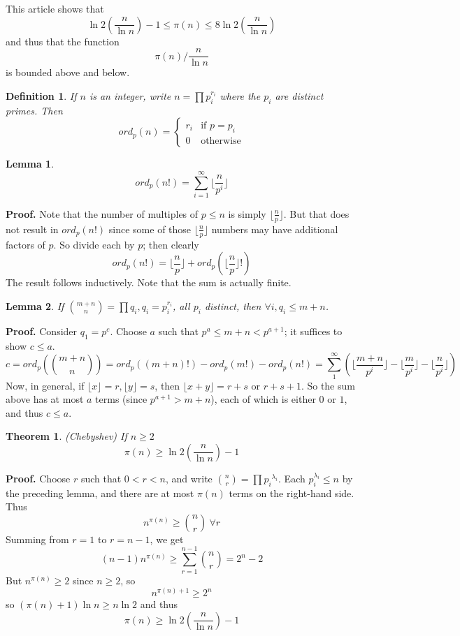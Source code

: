 \documentclass[12pt]{article}
\newtheorem{thm}{Theorem}
\newtheorem{defn}{Definition}
\newtheorem{lem}{Lemma}
\begin{document}
This article shows that
\[\ln 2\left(\frac{n}{\ln n}\right)-1\leq \pi(n)\leq 8\ln 2\left(\frac{n}{\ln n}\right)\]
and thus that the function
\[\pi(n)/\frac{n}{\ln n}\]
is bounded above and below.

\begin{defn} If $n$ is an integer, write $n=\prod p_i^{r_i}$ where the $p_i$ are distinct primes. Then
\[ord_p(n)=\begin{cases}
r_i&\text{if } p=p_i\\
0&\text{otherwise}
\end{cases}
\]
\end{defn}

\begin{lem}  
\[ord_p(n!)=\sum_{i=1}^{\infty}\lfloor \frac{n}{p^i}\rfloor\]
\end{lem}
\textbf{Proof.}
Note that the number of multiples of $p\leq n$ is simply $\lfloor \frac{n}{p}\rfloor$. But that does not result in $ord_p(n!)$ since some of those $\lfloor \frac{n}{p}\rfloor$ numbers may have additional factors of $p$. So divide each by $p$; then clearly 
\[ord_p(n!)=\lfloor \frac{n}{p}\rfloor+ord_p(\lfloor \frac{n}{p}\rfloor!)\]
The result follows inductively. Note that the sum is actually finite.


\begin{lem} If $\binom{m+n}{n}=\prod q_i, q_i=p_i^{r_i}$, all $p_i$ distinct, then $\forall i, q_i\leq m+n$.
\end{lem}
\textbf{Proof.}
Consider $q_1=p^c$. Choose $a$ such that $p^a\leq m+n<p^{a+1}$; it suffices to show $c\leq a$.
\[c=ord_p(\binom{m+n}{n})=ord_p((m+n)!)-ord_p(m!)-ord_p(n!)=\sum_1^{\infty} (\lfloor\frac{m+n}{p^i}\rfloor-\lfloor\frac{m}{p^i}\rfloor-\lfloor\frac{n}{p^i}\rfloor)\]
Now, in general, if $\lfloor x\rfloor=r, \lfloor y\rfloor=s$, then $\lfloor x+y\rfloor=r+s$ or $r+s+1$. So the sum above has at most $a$ terms (since $p^{a+1}>m+n$), each of which is either $0$ or $1$, and thus $c\leq a$.

\begin{thm} \emph{(Chebyshev)} If $n\geq 2$
\[\pi(n)\geq \ln 2\left(\frac{n}{\ln n}\right)-1\]
\end{thm}
\textbf{Proof.}
Choose $r$ such that $0<r<n$, and write $\binom{n}{r}=\prod p_i\!^{\lambda_i}$. Each $p_i^{\lambda_i}\leq n$ by the preceding lemma, and there are at most $\pi(n)$ terms on the right-hand side. Thus
\[n^{\pi(n)}\geq\binom{n}{r}\ \forall r\]
Summing from $r=1$ to $r=n-1$, we get
\[(n-1)n^{\pi(n)}\geq\sum_{r=1}^{n-1}\binom{n}{r}=2^n-2\]
But $n^{\pi(n)}\geq 2$ since $n\geq 2$, so
\[n^{\pi(n)+1}\geq 2^n\]
so $(\pi(n)+1)\ln n\geq n\ln 2$ and thus
\[\pi(n)\geq \ln 2\left(\frac{n}{\ln n}\right)-1
\]
\end{document}
